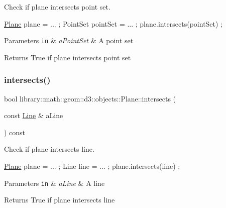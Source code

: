 Check if plane intersects point set. 


\begin{DoxyCode}
\hyperlink{classlibrary_1_1math_1_1geom_1_1d3_1_1objects_1_1_plane_a81fe78a983e2cb6ee6ad9bfabd22c3a4}{Plane} plane = ... ;
PointSet pointSet = ... ;
plane.intersects(pointSet) ;
\end{DoxyCode}



\begin{DoxyParams}[1]{Parameters}
\mbox{\tt in}  & {\em a\+Point\+Set} & A point set \\
\hline
\end{DoxyParams}
\begin{DoxyReturn}{Returns}
True if plane intersects point set 
\end{DoxyReturn}
\mbox{\label{classlibrary_1_1math_1_1geom_1_1d3_1_1objects_1_1_plane_a9d2b3f8758bd278430a7e818d4cd94a9}} 
\subsubsection{\texorpdfstring{intersects()}{intersects()}\hspace{0.1cm}{\footnotesize\ttfamily [3/5]}}
{\footnotesize\ttfamily bool library\+::math\+::geom\+::d3\+::objects\+::\+Plane\+::intersects (\begin{DoxyParamCaption}\item[{const \hyperlink{classlibrary_1_1math_1_1geom_1_1d3_1_1objects_1_1_line}{Line} \&}]{a\+Line }\end{DoxyParamCaption}) const}



Check if plane intersects line. 


\begin{DoxyCode}
\hyperlink{classlibrary_1_1math_1_1geom_1_1d3_1_1objects_1_1_plane_a81fe78a983e2cb6ee6ad9bfabd22c3a4}{Plane} plane = ... ;
Line line = ... ;
plane.intersects(line) ;
\end{DoxyCode}



\begin{DoxyParams}[1]{Parameters}
\mbox{\tt in}  & {\em a\+Line} & A line \\
\hline
\end{DoxyParams}
\begin{DoxyReturn}{Returns}
True if plane intersects line 
\end{DoxyReturn}
\mbox{\label{classlibrary_1_1math_1_1geom_1_1d3_1_1objects_1_1_plane_a3420c661accd61a01ef9e22868ffcfbf}} 
